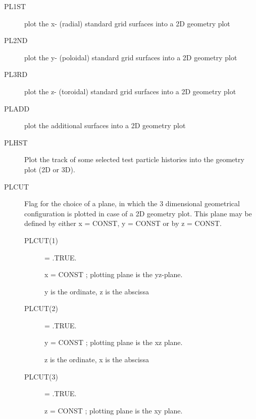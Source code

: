 \begin{description}
  \item[PL1ST] plot the x- (radial) standard grid surfaces
        into a 2D geometry plot
  \item[PL2ND] plot the y- (poloidal) standard grid
        surfaces into a 2D geometry plot
  \item[PL3RD] plot the z- (toroidal) standard
        grid surfaces into a 2D geometry plot
  \item[PLADD] plot the additional surfaces
        into a 2D geometry plot
  \item[PLHST] Plot the track of some selected test
        particle histories into the geometry plot (2D or 3D).
  \item[PLCUT] Flag for the choice of a plane, in which the 3 dimensional
        geometrical configuration is plotted in case of a 2D geometry plot.
        This plane may be defined by either x = CONST, y = CONST or by z = CONST.
        \begin{description}
          \item[PLCUT(1)] = .TRUE.

                x = CONST ; plotting plane is the yz-plane.

                y is the ordinate, z is the abscissa
          \item[PLCUT(2)] = .TRUE.

                y = CONST ; plotting plane is the xz plane.

                z is the ordinate, x is the abscissa
          \item[PLCUT(3)] = .TRUE.

                z = CONST ; plotting plane is the xy plane.


\end{description}
\end{description}
